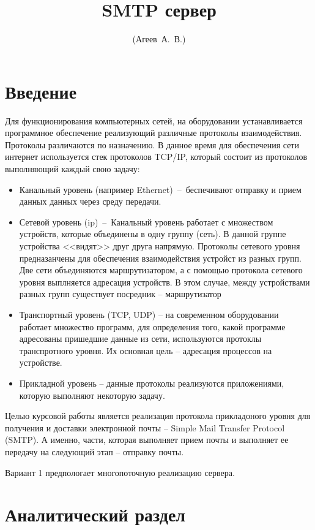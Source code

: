 \documentclass[a4paper,12pt]{report}
\title{SMTP сервер\textnumero 1}
\author{(Агеев~А.~В.)}
\begin{document}
	\maketitle

	\tableofcontents

	\chapter*{Введение}
	Для функционирования компьютерных сетей, на оборудовании устанавливается программное обеспечение реализующий различные протоколы взаимодействия. Протоколы различаются по назначению. В данное время для обеспечения сети интернет используется стек протоколов TCP/IP, который состоит из протоколов выполняющий каждый свою задачу:
	\begin{itemize}
		\item Канальный уровень (например Ethernet)~--~беспечивают отправку и прием данных данных через среду передачи.
		\item Сетевой уровень (ip)~--~Канальный уровень работает с множеством устройств, которые объединены в одну группу (сеть). В данной группе устройства <<видят>> друг друга напрямую. Протоколы сетевого уровня предназанчены для обеспечения взаимодействия устройст из разных групп. Две сети объединяются маршрутизатором, а с помощью протокола сетевого уровня выплняется адресация устройств. В этом случае, между устройствами разных групп существует посредник -- маршрутизатор
		\item Транспортный уровень (TCP, UDP) -- на современном оборудовании работает множество программ, для определения того, какой программе адресованы пришедшие данные из сети, используются протоклы транспротного уровня. Их основная цель -- адресация процессов на устройстве.
		\item Прикладной уровень -- данные протоколы реализуются приложениями, которую выполняют некоторую задачу. 
	\end{itemize}

	Целью курсовой работы является реализация протокола прикладоного уровня для получения и доставки электронной почты -- Simple Mail Transfer Protocol (SMTP). А именно, части, которая выполняет прием почты и выполняет ее передачу на следующий этап -- отправку почты. 
	
	Вариант 1 предпологает многопоточную реализацию сервера.

	\chapter{Аналитический раздел}
\end{document}
